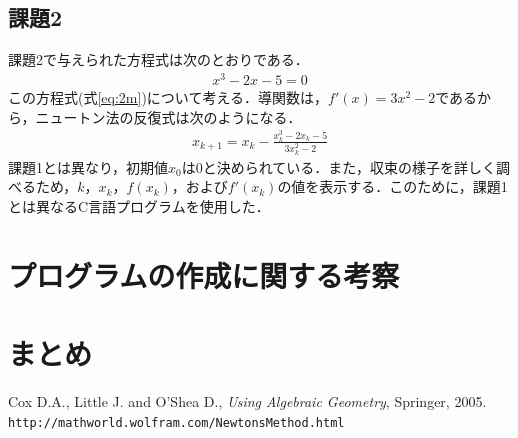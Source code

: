 \documentclass[12pt]{jarticle}
\renewcommand  \[  {\begin{eqnarray}}
\renewcommand  \]  {\end{eqnarray}}
\begin{document}
\subsection{課題2}
課題2で与えられた方程式は次のとおりである．
\[
x^3-2x-5 = 0
\label{eq:2m}
\]
この方程式(式\ref{eq:2m})について考える．導関数は，$f\prime(x)=3x^2-2$であるから，ニュートン法の反復式は次のようになる．
\[
x_{k+1}=x_k- \frac{x_k^3-2x_k-5}{3x_k^2-2}
\label{eq:2}
\]
課題1とは異なり，初期値$x_0$は$0$と決められている．また，収束の様子を詳しく調べるため，$k$，$x_k$，$f(x_k)$，および$f\prime(x_k)$の値を表示する．このために，課題1とは異なるC言語プログラムを使用した．


\section{プログラムの作成に関する考察}
\section{まとめ}

  Cox D.A., Little J. and O'Shea D., {\em Using Algebraic Geometry}, Springer, 2005.
  \verb|http://mathworld.wolfram.com/NewtonsMethod.html|
\end{document}
